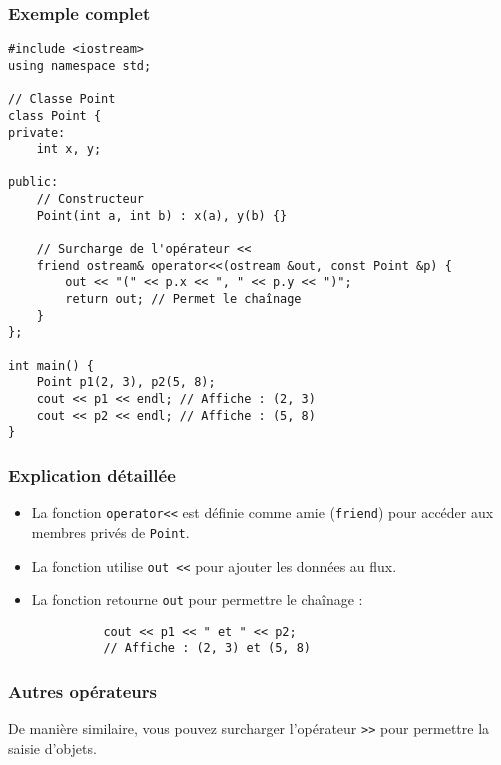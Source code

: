 \subsubsection{ Exemple complet}
\begin{tcolorbox}[colframe=blue!50!black, colback=blue!5!white, title=Exemple Complet de Surcharge de Flux]
\begin{verbatim}
#include <iostream>
using namespace std;

// Classe Point
class Point {
private:
    int x, y;

public:
    // Constructeur
    Point(int a, int b) : x(a), y(b) {}

    // Surcharge de l'opérateur <<
    friend ostream& operator<<(ostream &out, const Point &p) {
        out << "(" << p.x << ", " << p.y << ")";
        return out; // Permet le chaînage
    }
};

int main() {
    Point p1(2, 3), p2(5, 8);
    cout << p1 << endl; // Affiche : (2, 3)
    cout << p2 << endl; // Affiche : (5, 8)
}
\end{verbatim}
\end{tcolorbox}

\subsubsection{ Explication détaillée}
\begin{itemize}
    \item La fonction \texttt{operator<<} est définie comme amie (\texttt{friend}) pour accéder aux membres privés de \texttt{Point}.
    \item La fonction utilise \texttt{out <<} pour ajouter les données au flux.
    \item La fonction retourne \texttt{out} pour permettre le chaînage :
          \begin{tcolorbox}[colframe=blue!50!black, colback=blue!5!white, title=Exemple de Chaînage de Flux]
\begin{verbatim}
          cout << p1 << " et " << p2;
          // Affiche : (2, 3) et (5, 8)
          \end{verbatim}
\end{tcolorbox}
\end{itemize}

\subsubsection{ Autres opérateurs}
De manière similaire, vous pouvez surcharger l'opérateur \texttt{>>} pour permettre la saisie d'objets.

